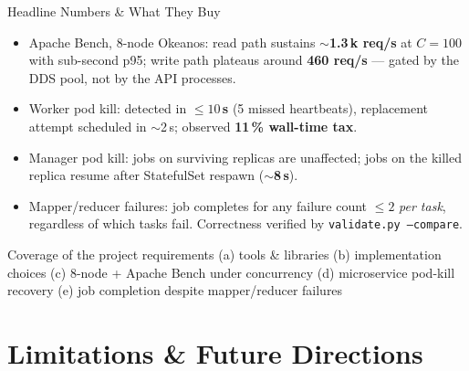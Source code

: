 \documentclass[11pt]{beamer}
\begin{document}
\begin{frame}{Headline Numbers \& What They Buy}
\begin{itemize}\small
  \item \alert{Apache Bench, 8-node Okeanos}: read path sustains $\sim$\textbf{1.3\,k req/s}
        at $C=100$ with sub-second p95; write path plateaus around \textbf{460 req/s}
        --- gated by the DDS pool, not by the API processes.
  \item \alert{Worker pod kill}: detected in \textbf{$\le 10$\,s} (5 missed heartbeats),
        replacement attempt scheduled in $\sim$2\,s; observed \textbf{11\,\% wall-time tax}.
  \item \alert{Manager pod kill}: jobs on surviving replicas are unaffected;
        jobs on the killed replica resume after StatefulSet respawn ($\sim$\textbf{8\,s}).
  \item \alert{Mapper/reducer failures}: job completes for any failure count
        $\le 2$ \emph{per task}, regardless of which tasks fail.
        Correctness verified by \texttt{validate.py --compare}.
\end{itemize}

\begin{alertblock}{Coverage of the project requirements}
(a) tools \& libraries \checkmark \quad (b) implementation choices \checkmark \quad
(c) 8-node + Apache Bench under concurrency \checkmark \quad
(d) microservice pod-kill recovery \checkmark \quad
(e) job completion despite mapper/reducer failures \checkmark
\end{alertblock}
\end{frame}

\section{Limitations \& Future Directions}
\end{document}

